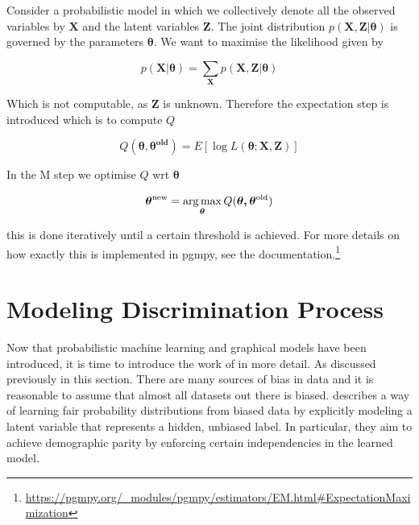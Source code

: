 Consider a probabilistic model in which we collectively denote all the observed
variables by $\boldsymbol{X}$ and the latent variables $\boldsymbol{Z}$. The joint distribution $p(\boldsymbol{X}, \boldsymbol{Z} | \boldsymbol{\theta})$ is governed by the parameters $\boldsymbol{\theta}$. We want to maximise the likelihood given by

\begin{equation*}
    p(\boldsymbol{X} | \boldsymbol{\theta}) = \sum_{\boldsymbol{X}} p(\boldsymbol{X}, \boldsymbol{Z} | \boldsymbol{\theta})
\end{equation*}

Which is not computable, as $\boldsymbol{Z}$ is unknown. Therefore the expectation step is introduced which is to compute $Q$

\begin{equation*}
    Q(\boldsymbol{\theta, \theta^{\text{old}}}) = E[\log L(\boldsymbol{\theta}; \boldsymbol{X}, \boldsymbol{Z})]
\end{equation*}

In the M step we optimise $Q$ wrt $\boldsymbol{\theta}$

\begin{equation*}
    \boldsymbol{\theta^{\text{new}}} = \operatorname*{arg\,max}_{\boldsymbol{\theta}} Q(\boldsymbol{\theta, \theta^{\text{old}}})
\end{equation*}

this is done iteratively until a certain threshold is achieved. For more details on how exactly this is implemented in pgmpy, see the documentation.\footnote{\url{https://pgmpy.org/_modules/pgmpy/estimators/EM.html\#ExpectationMaximization}}

\section{Modeling Discrimination Process}
\label{sec:paper1}
Now that probabilistic machine learning and graphical models have been introduced, it is time to introduce the work of \citet{Choi:2021:AIII} in more detail. As discussed previously in this section. There are many sources of bias in data and it is reasonable to assume that almost all datasets out there is biased. \citet{Choi:2021:AIII} describes a way of learning fair probability distributions from biased data by explicitly modeling a latent variable that represents a hidden, unbiased label. In particular, they aim to achieve demographic parity by enforcing
certain independencies in the learned model.


